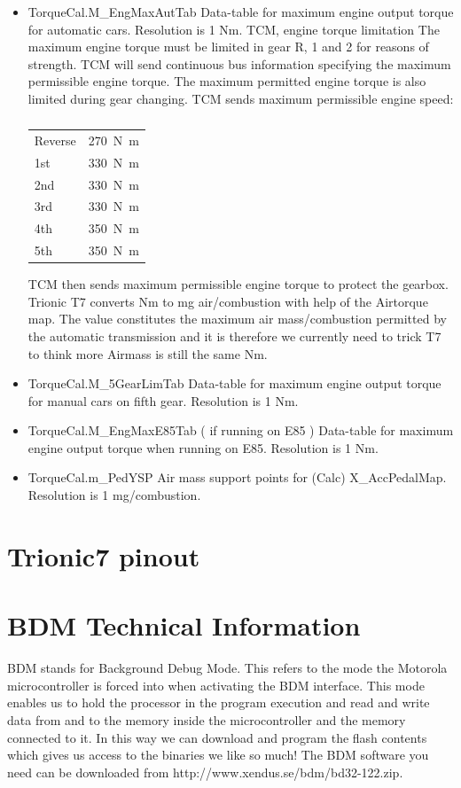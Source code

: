 \documentclass[11pt,a4paper]{book}
\begin{document}
\begin{itemize}
    \item
TorqueCal.M\_EngMaxAutTab
Data-table for maximum engine output torque for automatic cars. Resolution is 1 Nm.
TCM, engine torque limitation
The maximum engine torque must be limited in gear R, 1 and 2 for reasons of strength. TCM will send
continuous bus information specifying the maximum permissible engine torque. The maximum
permitted engine torque is also limited during gear changing. TCM sends maximum permissible engine
speed:
\begin{table}
    \centering
    \begin{tabular}{ll}
        Reverse & \SI{270}{\newton\meter} \\
        1st & \SI{330}{\newton\meter} \\
        2nd & \SI{330}{\newton\meter} \\
        3rd & \SI{330}{\newton\meter} \\
        4th & \SI{350}{\newton\meter} \\
        5th & \SI{350}{\newton\meter}
    \end{tabular}
    \caption{}
    \label{tab:}
\end{table}
TCM then sends maximum permissible engine torque to protect the gearbox.
Trionic T7 converts Nm to mg air/combustion with help of the Airtorque map. The value constitutes
the maximum air mass/combustion permitted by the automatic transmission and it is therefore we
currently need to trick T7 to think more Airmass is still the same Nm.
    \item
TorqueCal.M\_5GearLimTab
Data-table for maximum engine output torque for manual cars on fifth gear. Resolution is 1 Nm.
    \item
TorqueCal.M\_EngMaxE85Tab ( if running on E85 )
Data-table for maximum engine output torque when running on E85. Resolution is 1 Nm.
    \item
TorqueCal.m\_PedYSP
Air mass support points for (Calc) X\_AccPedalMap. Resolution is 1 mg/combustion.
\end{itemize}

\chapter{Trionic7 pinout}


\chapter{BDM Technical Information}
BDM stands for Background Debug Mode. This refers to the mode the Motorola microcontroller is
forced into when activating the BDM interface. This mode enables us to hold the processor in the
program execution and read and write data from and to the memory inside the microcontroller and
the memory connected to it. In this way we can download and program the flash contents which gives
us access to the binaries we like so much! The BDM software you need can be downloaded from
http://www.xendus.se/bdm/bd32-122.zip.
\end{document}
